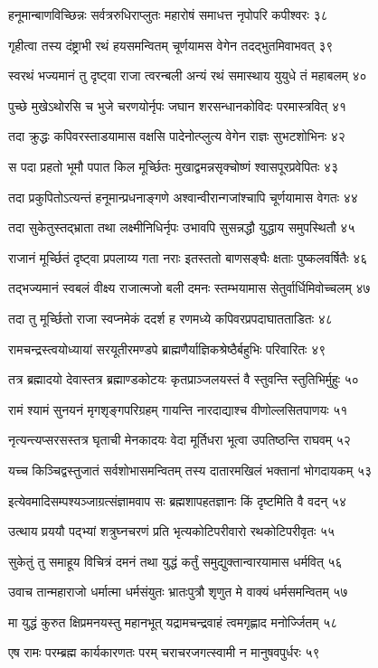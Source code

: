 हनूमान्बाणविच्छिन्नः सर्वत्ररुधिराप्लुतः
महारोषं समाधत्त नृपोपरि कपीश्वरः ३८

गृहीत्वा तस्य दंष्ट्राभी रथं हयसमन्वितम्
चूर्णयामस वेगेन तदद्भुतमिवाभवत् ३९

स्वरथं भज्यमानं तु दृष्ट्वा राजा त्वरन्बली
अन्यं रथं समास्थाय युयुधे तं महाबलम् ४०

पुच्छे मुखेऽथोरसि च भुजे चरणयोर्नृपः
जघान शरसन्धानकोविदः परमास्त्रवित् ४१

तदा क्रुद्धः कपिवरस्ताडयामास वक्षसि
पादेनोत्प्लुत्य वेगेन राज्ञः सुभटशोभिनः ४२

स पदा प्रहतो भूमौ पपात किल मूर्च्छितः
मुखाद्वमन्नसृक्चोष्णं श्वासपूरप्रवेपितः ४३

तदा प्रकुपितोऽत्यन्तं हनूमान्प्रधनाङ्गणे
अश्वान्वीरान्गजांश्चापि चूर्णयामास वेगतः ४४

तदा सुकेतुस्तद्भ्राता तथा लक्ष्मीनिधिर्नृपः
उभावपि सुसन्नद्धौ युद्धाय समुपस्थितौ ४५

राजानं मूर्च्छितं दृष्ट्वा प्रपलाय्य गता नराः
इतस्ततो बाणसङ्घैः क्षताः पुष्कलवर्षितैः ४६

तद्भज्यमानं स्वबलं वीक्ष्य राजात्मजो बली
दमनः स्तम्भयामास सेतुर्वार्धिमिवोच्चलम् ४७

तदा तु मूर्च्छितो राजा स्वप्नमेकं ददर्श ह
रणमध्ये कपिवरप्रपदाघातताडितः ४८

रामचन्द्रस्त्वयोध्यायां सरयूतीरमण्डपे
ब्राह्मणैर्याज्ञिकश्रेष्ठैर्बहुभिः परिवारितः ४९

तत्र ब्रह्मादयो देवास्तत्र ब्रह्माण्डकोटयः
कृतप्राञ्जलयस्तं वै स्तुवन्ति स्तुतिभिर्मुहुः ५०

रामं श्यामं सुनयनं मृगशृङ्गपरिग्रहम्
गायन्ति नारदाद्याश्च वीणोल्लसितपाणयः ५१

नृत्यन्त्यप्सरसस्तत्र घृताची मेनकादयः
वेदा मूर्तिधरा भूत्वा उपतिष्ठन्ति राघवम् ५२

यच्च किञ्चिद्वस्तुजातं सर्वशोभासमन्वितम्
तस्य दातारमखिलं भक्तानां भोगदायकम् ५३

इत्येवमादिसम्पश्यञ्जाग्रत्संज्ञामवाप सः
ब्रह्मशापहतज्ञानः किं दृष्टमिति वै वदन् ५४

उत्थाय प्रययौ पद्भ्यां शत्रुघ्नचरणं प्रति
भृत्यकोटिपरीवारो रथकोटिपरीवृतः ५५

सुकेतुं तु समाहूय विचित्रं दमनं तथा
युद्धं कर्तुं समुद्युक्तान्वारयामास धर्मवित् ५६

उवाच तान्महाराजो धर्मात्मा धर्मसंयुतः
भ्रातःपुत्रौ शृणुत मे वाक्यं धर्मसमन्वितम् ५७

मा युद्धं कुरुत क्षिप्रमनयस्तु महानभूत्
यद्रामचन्द्रवाहं त्वमगृह्णाद मनोर्ज्जितम् ५८

एष रामः परम्ब्रह्म कार्यकारणतः परम्
चराचरजगत्स्वामी न मानुषवपुर्धरः ५९


